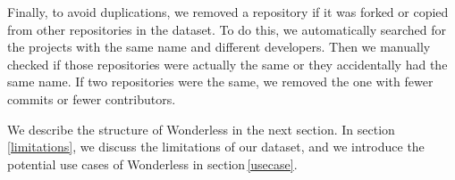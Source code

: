 Finally, to avoid duplications, we removed a repository if it was forked 
or copied from other repositories in the dataset. To do this, we automatically 
searched for the projects with the same name and different developers. 
Then we manually checked if those repositories were actually the same or 
they accidentally had the same name. If two repositories were the same, 
we removed the one with fewer commits or fewer contributors.

We describe the structure of Wonderless in the next section. 
In section\,\ref{limitations}, we discuss the limitations of our dataset, 
and we introduce the potential use cases of Wonderless in section\,\ref{usecase}.
